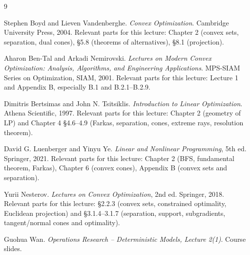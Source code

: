 \documentclass[11pt,a4paper,openany]{ctexrep}
\theoremstyle{definition}
\begin{document}
\begin{thebibliography}{9}

Stephen Boyd and Lieven Vandenberghe.
\newblock \emph{Convex Optimization}.
\newblock Cambridge University Press, 2004.
\newblock Relevant parts for this lecture: Chapter 2 (convex sets, separation, dual cones), \S5.8 (theorems of alternatives), \S8.1 (projection).

Aharon Ben-Tal and Arkadi Nemirovski.
\newblock \emph{Lectures on Modern Convex Optimization: Analysis, Algorithms, and Engineering Applications}.
\newblock MPS-SIAM Series on Optimization, SIAM, 2001.
\newblock Relevant parts for this lecture: Lecture 1 and Appendix B, especially B.1 and B.2.1--B.2.9.

Dimitris Bertsimas and John N. Tsitsiklis.
\newblock \emph{Introduction to Linear Optimization}.
\newblock Athena Scientific, 1997.
\newblock Relevant parts for this lecture: Chapter 2 (geometry of LP) and Chapter 4 \S4.6--4.9 (Farkas, separation, cones, extreme rays, resolution theorem).

David G. Luenberger and Yinyu Ye.
\newblock \emph{Linear and Nonlinear Programming}, 5th ed.
\newblock Springer, 2021.
\newblock Relevant parts for this lecture: Chapter 2 (BFS, fundamental theorem, Farkas), Chapter 6 (convex cones), Appendix B (convex sets and separation).

Yurii Nesterov.
\newblock \emph{Lectures on Convex Optimization}, 2nd ed.
\newblock Springer, 2018.
\newblock Relevant parts for this lecture: \S2.2.3 (convex sets, constrained optimality, Euclidean projection) and \S3.1.4--3.1.7 (separation, support, subgradients, tangent/normal cones and optimality).

Guohua Wan.
\newblock \emph{Operations Research -- Deterministic Models, Lecture 2(1)}.
\newblock Course slides.

\end{thebibliography}
\end{document}
